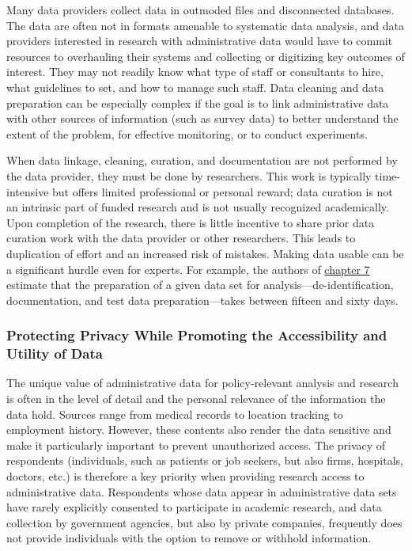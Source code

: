 \documentclass[
]{WileySix}
\begin{document}
Many data providers collect data in outmoded files and disconnected databases. The data are often not in formats amenable to systematic data analysis, and data providers interested in research with administrative data would have to commit resources to overhauling their systems and collecting or digitizing key outcomes of interest. They may not readily know what type of staff or consultants to hire, what guidelines to set, and how to manage such staff. Data cleaning and data preparation can be especially complex if the goal is to link administrative data with other sources of information (such as survey data) to better understand the extent of the problem, for effective monitoring, or to conduct experiments.

When data linkage, cleaning, curation, and documentation are not performed by the data provider, they must be done by researchers. This work is typically time-intensive but offers limited professional or personal reward; data curation is not an intrinsic part of funded research and is not usually recognized academically. Upon completion of the research, there is little incentive to share prior data curation work with the data provider or other researchers. This leads to duplication of effort and an increased risk of mistakes. Making data usable can be a significant hurdle even for experts. For example, the authors of \protect\hyperlink{iab}{chapter 7} estimate that the preparation of a given data set for analysis---de-identification, documentation, and test data preparation---takes between fifteen and sixty days.

\hypertarget{protecting-privacy-while-promoting-the-accessibility-and-utility-of-data}{%
\subsubsection{Protecting Privacy While Promoting the Accessibility and Utility of Data}\label{protecting-privacy-while-promoting-the-accessibility-and-utility-of-data}}

The unique value of administrative data for policy-relevant analysis and research is often in the level of detail and the personal relevance of the information the data hold. Sources range from medical records to location tracking to employment history. However, these contents also render the data sensitive and make it particularly important to prevent unauthorized access. The privacy of respondents (individuals, such as patients or job seekers, but also firms, hospitals, doctors, etc.) is therefore a key priority when providing research access to administrative data. Respondents whose data appear in administrative data sets have rarely explicitly consented to participate in academic research, and data collection by government agencies, but also by private companies, frequently does not provide individuals with the option to remove or withhold information.
\end{document}

